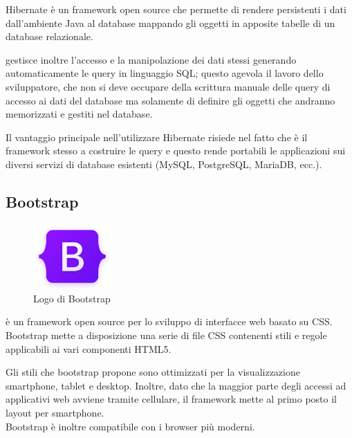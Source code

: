 \noindent Hibernate è un framework open source che permette di  rendere persistenti i dati dall'ambiente Java al database mappando gli oggetti in apposite tabelle di un database relazionale.

\setlength{\parskip}{3ex}

\ap{{[b]}} gestisce inoltre l'accesso e la manipolazione dei dati stessi generando automaticamente le query in linguaggio SQL; questo agevola il lavoro dello sviluppatore, che non si deve occupare della scrittura manuale delle query di accesso ai dati del database ma solamente di definire gli oggetti che andranno memorizzati e gestiti nel database.

\setlength{\parskip}{2ex}

\noindent Il vantaggio principale nell'utilizzare Hibernate risiede nel fatto che è il framework stesso a costruire le query e questo rende portabili le applicazioni sui diversi servizi di database esistenti (MySQL, PostgreSQL, MariaDB, ecc.).

\subsection{Bootstrap}

\begin{figure}[!h]
	\centering
	\includegraphics[width=3cm]{../images/Bootstrap-logo.png}
	\caption{Logo di Bootstrap}
\end{figure}

\ap{{[b]}} è un framework open source per lo sviluppo di interfacce web basato su CSS. Bootstrap mette a disposizione una serie di file CSS contenenti stili e regole applicabili ai vari componenti HTML5.

\setlength{\parskip}{3ex}

\noindent Gli stili che bootstrap propone sono ottimizzati per la visualizzazione smartphone, tablet e desktop. Inoltre, dato che la maggior parte degli accessi ad applicativi web avviene tramite cellulare, il framework mette al primo posto il layout per smartphone.\\
Bootstrap è inoltre compatibile con i browser più moderni.

